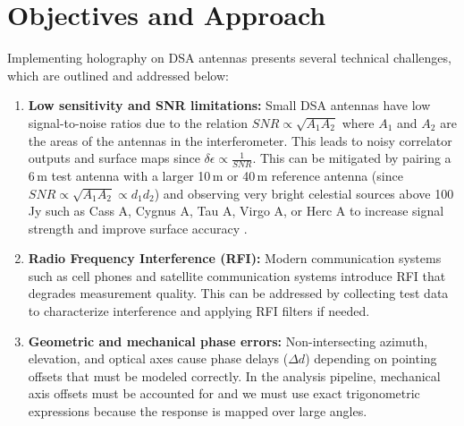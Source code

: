 \documentclass[12pt]{extarticle} %
\begin{document}
\section{Objectives and Approach}\label{sec:Objectives}
Implementing holography on DSA antennas presents several technical challenges, which are outlined and addressed below:
\begin{enumerate}
    \item \textbf{Low sensitivity and SNR limitations:} Small DSA antennas have low signal-to-noise ratios due to the relation $SNR \propto \sqrt{A_1 A_2}$ where $A_1$ and $A_2$ are the areas of the antennas in the interferometer. This leads to noisy correlator outputs and surface maps since $\delta \epsilon \propto \frac{1}{SNR}$. This can be mitigated by pairing a 6\,m test antenna with a larger 10\,m or 40\,m reference antenna (since $SNR \propto \sqrt{A_1 A_2} \propto d_1 d_2$) and observing very bright celestial sources above 100\,Jy such as Cass A, Cygnus A, Tau A, Virgo A, or Herc A to increase signal strength and improve surface accuracy \cite{HoloMeasurementsDSA}.
    \item \textbf{Radio Frequency Interference (RFI):} Modern communication systems such as cell phones and satellite communication systems introduce RFI that degrades measurement quality. This can be addressed by collecting test data to characterize interference and applying RFI filters if needed.
    \item \textbf{Geometric and mechanical phase errors:} Non-intersecting azimuth, elevation, and optical axes cause phase delays ($\Delta d$) depending on pointing offsets that must be modeled correctly. In the analysis pipeline, mechanical axis offsets must be accounted for and we must use exact trigonometric expressions because the response is mapped over large angles.
\end{enumerate}
\end{document}
